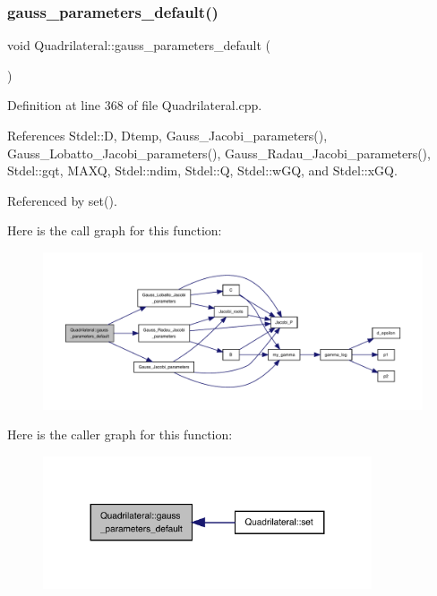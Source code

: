 \subsubsection{\texorpdfstring{gauss\+\_\+parameters\+\_\+default()}{gauss\_parameters\_default()}}
{\footnotesize\ttfamily void Quadrilateral\+::gauss\+\_\+parameters\+\_\+default (\begin{DoxyParamCaption}{ }\end{DoxyParamCaption})\hspace{0.3cm}{\ttfamily [private]}}



Definition at line 368 of file Quadrilateral.\+cpp.



References Stdel\+::D, Dtemp, Gauss\+\_\+\+Jacobi\+\_\+parameters(), Gauss\+\_\+\+Lobatto\+\_\+\+Jacobi\+\_\+parameters(), Gauss\+\_\+\+Radau\+\_\+\+Jacobi\+\_\+parameters(), Stdel\+::gqt, M\+A\+XQ, Stdel\+::ndim, Stdel\+::Q, Stdel\+::w\+GQ, and Stdel\+::x\+GQ.



Referenced by set().

Here is the call graph for this function\+:
\nopagebreak
\begin{figure}[H]
\begin{center}
\leavevmode
\includegraphics[width=350pt]{classQuadrilateral_a6d2aa65447f4ca5c0957aba5da287a7a_cgraph}
\end{center}
\end{figure}
Here is the caller graph for this function\+:
\nopagebreak
\begin{figure}[H]
\begin{center}
\leavevmode
\includegraphics[width=275pt]{classQuadrilateral_a6d2aa65447f4ca5c0957aba5da287a7a_icgraph}
\end{center}
\end{figure}
\mbox{\label{classStdel_a0775d0c4f7f15ae26bd45fc949e6f6b9}} 
